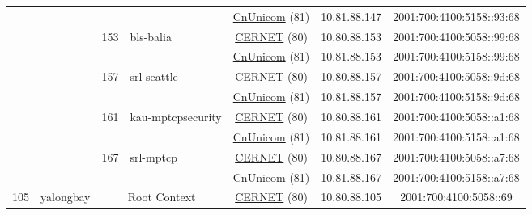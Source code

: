 \begin{small}
\begin{center}
\begin{longtable}{|c|c|c|c|c|c|c|c|}
  &  &  &  & \multicolumn{2}{|c|}{\tiny{\href{http://www.chinaunicom.com}{CnUnicom} (81)}} & \tiny{10.81.88.147} & \tiny{2001:700:4100:5158::93:68} \\* \cline{3-3}\cline{4-4}\cline{5-5}\cline{6-6}\cline{7-7}\cline{8-8}
  &  & \multirow{2}{*}{\tiny{153}} & \multicolumn{1}{|l|}{\multirow{2}{*}{\tiny{bls-balia}}} & \multicolumn{2}{|c|}{\tiny{\href{http://www.cernet.edu.cn}{CERNET} (80)}} & \tiny{10.80.88.153} & \tiny{2001:700:4100:5058::99:68} \\* \cline{5-5}\cline{6-6}\cline{7-7}\cline{8-8}
  &  &  &  & \multicolumn{2}{|c|}{\tiny{\href{http://www.chinaunicom.com}{CnUnicom} (81)}} & \tiny{10.81.88.153} & \tiny{2001:700:4100:5158::99:68} \\* \cline{3-3}\cline{4-4}\cline{5-5}\cline{6-6}\cline{7-7}\cline{8-8}
  &  & \multirow{2}{*}{\tiny{157}} & \multicolumn{1}{|l|}{\multirow{2}{*}{\tiny{srl-seattle}}} & \multicolumn{2}{|c|}{\tiny{\href{http://www.cernet.edu.cn}{CERNET} (80)}} & \tiny{10.80.88.157} & \tiny{2001:700:4100:5058::9d:68} \\* \cline{5-5}\cline{6-6}\cline{7-7}\cline{8-8}
  &  &  &  & \multicolumn{2}{|c|}{\tiny{\href{http://www.chinaunicom.com}{CnUnicom} (81)}} & \tiny{10.81.88.157} & \tiny{2001:700:4100:5158::9d:68} \\* \cline{3-3}\cline{4-4}\cline{5-5}\cline{6-6}\cline{7-7}\cline{8-8}
  &  & \multirow{2}{*}{\tiny{161}} & \multicolumn{1}{|l|}{\multirow{2}{*}{\tiny{kau-mptcpsecurity}}} & \multicolumn{2}{|c|}{\tiny{\href{http://www.cernet.edu.cn}{CERNET} (80)}} & \tiny{10.80.88.161} & \tiny{2001:700:4100:5058::a1:68} \\* \cline{5-5}\cline{6-6}\cline{7-7}\cline{8-8}
  &  &  &  & \multicolumn{2}{|c|}{\tiny{\href{http://www.chinaunicom.com}{CnUnicom} (81)}} & \tiny{10.81.88.161} & \tiny{2001:700:4100:5158::a1:68} \\* \cline{3-3}\cline{4-4}\cline{5-5}\cline{6-6}\cline{7-7}\cline{8-8}
  &  & \multirow{2}{*}{\tiny{167}} & \multicolumn{1}{|l|}{\multirow{2}{*}{\tiny{srl-mptcp}}} & \multicolumn{2}{|c|}{\tiny{\href{http://www.cernet.edu.cn}{CERNET} (80)}} & \tiny{10.80.88.167} & \tiny{2001:700:4100:5058::a7:68} \\* \cline{5-5}\cline{6-6}\cline{7-7}\cline{8-8}
  &  &  &  & \multicolumn{2}{|c|}{\tiny{\href{http://www.chinaunicom.com}{CnUnicom} (81)}} & \tiny{10.81.88.167} & \tiny{2001:700:4100:5158::a7:68} \\ \hline
 \multirow{20}{*}{\tiny{105}} & \multicolumn{1}{|l|}{\multirow{20}{*}{\tiny{yalongbay}}} & \multicolumn{2}{|c|}{\multirow{2}{*}{\tiny{Root Context}}} & \multicolumn{2}{|c|}{\tiny{\href{http://www.cernet.edu.cn}{CERNET} (80)}} & \tiny{10.80.88.105} & \tiny{2001:700:4100:5058::69} \\* \cline{5-5}\cline{6-6}\cline{7-7}\cline{8-8}

\end{longtable}
\end{center}
\end{small}
